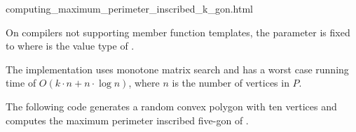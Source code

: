 \begin{ccHtmlClassFile}{computing_maximum_perimeter_inscribed_k_gon.html}
  \ccTagDefaults

  
  On compilers not supporting member function templates, the parameter
   is fixed to
   where  is the
  value type of .
  
  \ccImplementation The implementation uses monotone matrix
  search\cite{akmsw-gamsa-87} and has a worst case running time of $O(k
  \cdot n + n \cdot \log n)$, where $n$ is the number of vertices in
  $P$.

  \ccExample The following code generates a random convex polygon
   with ten vertices and computes the maximum perimeter inscribed
  five-gon of .


\end{ccHtmlClassFile}

